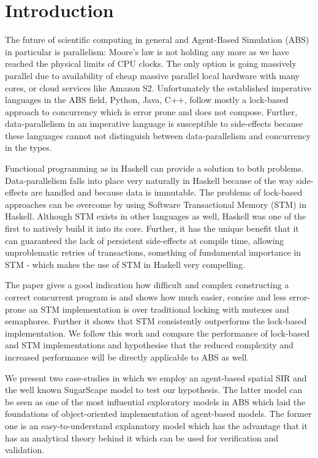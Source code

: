 \section{Introduction} %
The future of scientific computing in general and Agent-Based Simulation (ABS) in particular is parallelism: Moore's law is not holding any more as we have reached the physical limits of CPU clocks. The only option is going massively parallel due to availability of cheap massive parallel local hardware with many cores, or cloud services like Amazon S2. Unfortunately the established imperative languages in the ABS field, Python, Java, C++, follow mostly a lock-based approach to concurrency which is error prone and does not compose. Further, data-parallelism in an imperative language is susceptible to side-effects because these languages cannot not distinguish between data-parallelism and concurrency in the types. 

Functional programming as in Haskell can provide a solution to both problems. Data-parallelism falls into place very naturally in Haskell because of the way side-effects are handled and because data is immutable. The problems of lock-based approaches can be overcome by using Software Transactional Memory (STM) in Haskell. Although STM exists in other languages as well, Haskell was one of the first to natively build it into its core. Further, it has the unique benefit that it can guaranteed the lack of persistent side-effects at compile time, allowing unproblematic retries of transactions, something of fundamental importance in STM - which makes the use of STM in Haskell very compelling.

The paper \cite{discolo_lock_2006} gives a good indication how difficult and complex constructing a correct concurrent program is and shows how much easier, concise and less error-prone an STM implementation is over traditional locking with mutexes and semaphores. Further it shows that STM consistently outperforms the lock-based implementation. We follow this work and compare the performance of lock-based and STM implementations and hypothesise that the reduced complexity and increased performance will be directly applicable to ABS as well.

We present two case-studies in which we employ an agent-based spatial SIR \citep{macal_agent-based_2010, thaler_pure_2019} and the well known SugarScape \citep{epstein_growing_1996} model to test our hypothesis. The latter model can be seen as one of the most influential exploratory models in ABS which laid the foundations of object-oriented implementation of agent-based models. The former one is an easy-to-understand explanatory model which has the advantage that it has an analytical theory behind it which can be used for verification and validation. 

